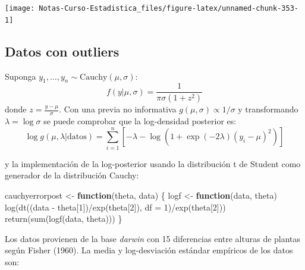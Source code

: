 \documentclass[
  12pt,
]{book}
\newenvironment{Shaded}{\begin{snugshade}}{\end{snugshade}}
\newcommand{\AttributeTok}[1]{\textcolor[rgb]{0.77,0.63,0.00}{#1}}
\newcommand{\ControlFlowTok}[1]{\textcolor[rgb]{0.13,0.29,0.53}{\textbf{#1}}}
\newcommand{\DecValTok}[1]{\textcolor[rgb]{0.00,0.00,0.81}{#1}}
\newcommand{\FunctionTok}[1]{\textcolor[rgb]{0.00,0.00,0.00}{#1}}
\newcommand{\NormalTok}[1]{#1}
\newcommand{\OtherTok}[1]{\textcolor[rgb]{0.56,0.35,0.01}{#1}}
\newcommand{\SpecialCharTok}[1]{\textcolor[rgb]{0.00,0.00,0.00}{#1}}
\theoremstyle{definition}
\theoremstyle{definition}
\theoremstyle{definition}
\theoremstyle{definition}
\theoremstyle{remark}
\begin{document}
\begin{center}\texttt{[image: Notas-Curso-Estadistica\_files/figure-latex/unnamed-chunk-353-1]} \end{center}

\hypertarget{datos-con-outliers}{%
\subsection{Datos con outliers}\label{datos-con-outliers}}

Suponga \(y_1,\ldots,y_n\sim \text{Cauchy}(\mu,\sigma)\):
\[f(y|\mu,\sigma)=\frac{1}{\pi\sigma(1+z^2)}\]
donde \(z=\frac{y-\mu}{\sigma}\). Con una previa no informativa \(g(\mu,\sigma)\propto 1/\sigma\) y transformando \(\lambda = \log \sigma\) se puede comprobar que la log-densidad posterior es:
\[\log g(\mu,\lambda|\text{datos}) = \sum_{i=1}^n\left[-\lambda-\log\left(1+\exp(-2\lambda)(y_i-\mu)^2\right)\right]\]

y la implementación de la log-posterior usando la distribución t de Student como generador de la distribución Cauchy:

\begin{Shaded}
\begin{Highlighting}[]
\NormalTok{cauchyerrorpost }\OtherTok{\textless{}{-}} \ControlFlowTok{function}\NormalTok{(theta, data) \{}
\NormalTok{    logf }\OtherTok{\textless{}{-}} \ControlFlowTok{function}\NormalTok{(data, theta) }\FunctionTok{log}\NormalTok{(}\FunctionTok{dt}\NormalTok{((data }\SpecialCharTok{{-}}\NormalTok{ theta[}\DecValTok{1}\NormalTok{])}\SpecialCharTok{/}\FunctionTok{exp}\NormalTok{(theta[}\DecValTok{2}\NormalTok{]),}
        \AttributeTok{df =} \DecValTok{1}\NormalTok{)}\SpecialCharTok{/}\FunctionTok{exp}\NormalTok{(theta[}\DecValTok{2}\NormalTok{]))}
    \FunctionTok{return}\NormalTok{(}\FunctionTok{sum}\NormalTok{(}\FunctionTok{logf}\NormalTok{(data, theta)))}
\NormalTok{\}}
\end{Highlighting}
\end{Shaded}

Los datos provienen de la base \emph{darwin} con 15 diferencias entre alturas de plantas según Fisher (1960). La media y log-desviación estándar empíricos de los datos son:

\begin{Shaded}
\end{Shaded}
\end{document}
